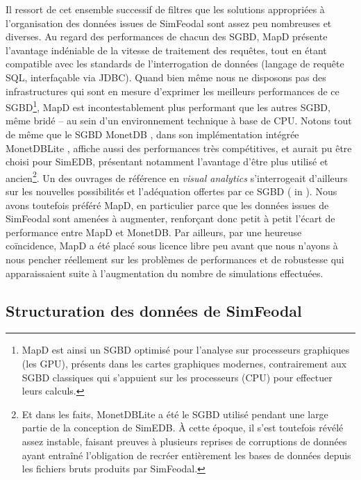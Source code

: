 			Il ressort de cet ensemble successif de filtres que les solutions appropriées à l'organisation des données issues de SimFeodal sont assez peu nombreuses et diverses.
			Au regard des performances de chacun des SGBD, MapD \autocite{root_mapd_2016} présente l'avantage indéniable de la vitesse de traitement des requêtes, tout en étant compatible avec les standards de l'interrogation de données (langage de requête SQL, interfaçable via JDBC).
			Quand bien même nous ne disposons pas des infrastructures qui sont en mesure d'exprimer les meilleurs performances de ce SGBD\footnote{
				MapD est ainsi un SGBD optimisé pour l'analyse sur processeurs graphiques (les GPU), présents dans les cartes graphiques modernes, contrairement aux SGBD classiques qui s'appuient sur les processeurs (CPU) pour effectuer leurs calculs.
			}, MapD est incontestablement plus performant que les autres SGBD, même \og bridé\fg{} -- au sein d'un environnement technique à base de CPU.
			Notons tout de même que le SGBD MonetDB \autocite{vermeij_monetdb_2008}, dans son implémentation intégrée MonetDBLite \autocite{raasveldt_monetdblite_2018}, affiche aussi des performances très compétitives, et aurait pu être choisi pour SimEDB, présentant notamment l'avantage d'être plus utilisé et ancien\footnote{
				Et dans les faits, MonetDBLite a été le SGBD utilisé pendant une large partie de la conception de SimEDB.
				À cette époque, il s'est toutefois révélé assez instable, faisant preuves à plusieurs reprises de corruptions de données ayant entraîné l'obligation de recréer entièrement les bases de données depuis les fichiers bruts produits par SimFeodal.
			}.
		Un des ouvrages de référence en \textit{visual analytics} s'interrogeait d'ailleurs sur les nouvelles possibilités et l'adéquation offertes par ce SGBD (\cite[105]{fekete_infrastructure_2010} in \cite{keim_mastering_2010}).
		Nous avons toutefois préféré MapD, en particulier parce que les données issues de SimFeodal sont amenées à augmenter, renforçant donc petit à petit l'écart de performance entre MapD et MonetDB.
		Par ailleurs, par une heureuse coïncidence, MapD a été placé sous licence libre peu avant que nous n'ayons à nous pencher réellement sur les problèmes de performances et de robustesse qui apparaissaient suite à l'augmentation du nombre de simulations effectuées.


	\subsection{Structuration des données de SimFeodal}

